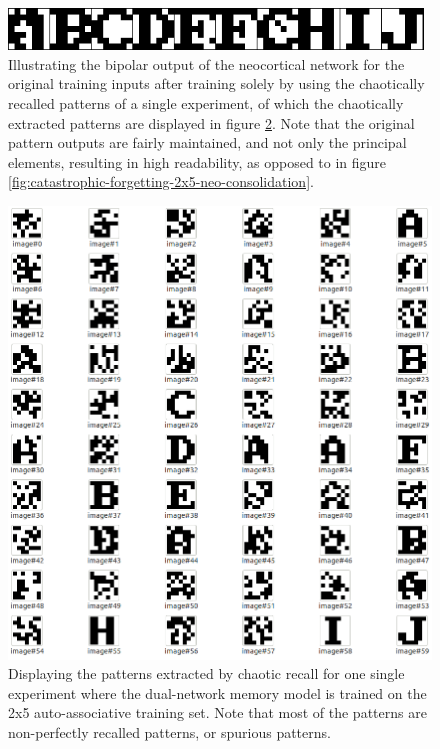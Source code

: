 \begin{figure}
    \centering
    \includegraphics[width=11cm]{fig/neo-consolidation/one-2x5-run-sync-15-iters42-exp0-15-iters}
    \caption{Illustrating the bipolar output of the neocortical network for the original training inputs after training solely by using the chaotically recalled patterns of a single experiment, of which the chaotically extracted patterns are displayed in figure \ref{fig:chaotic-recall-2x5-15-iters-exp0}. Note that the original pattern outputs are fairly maintained, and not only the principal elements, resulting in high readability, as opposed to in figure \ref{fig:catastrophic-forgetting-2x5-neo-consolidation}.}
    \label{fig:sync-neo-aggregate-output-2x5}
\end{figure}

\begin{figure}
    \centering
    \includegraphics[width=13cm]{fig/neo-consolidation/chaotic-recall-2x5-15-iters-exp0}
    \caption{Displaying the patterns extracted by chaotic recall for one single experiment where the dual-network memory model is trained on the 2x5 auto-associative training set. Note that most of the patterns are non-perfectly recalled patterns, or spurious patterns.}
    \label{fig:chaotic-recall-2x5-15-iters-exp0}
\end{figure}

